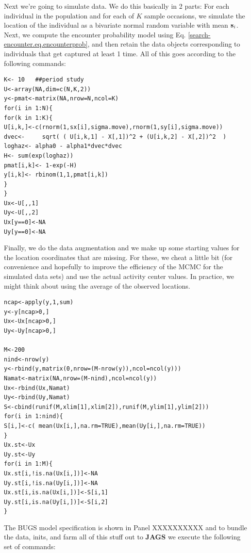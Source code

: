 Next we're going to simulate data. We do this basically in 2 parts:
For each individual in the population and for each of $K$ sample
occasions, we simulate the location of the individual as a bivariate
normal random variable with mean ${\bf s}_i$. Next, we compute the
encounter probability model using
Eq. \ref{search-encounter.eq.encounterprob}, and then retain the
data objects corresponding to individuals that get captured at least 1
time. All of this goes
according to the following commands:
{\small
\begin{verbatim}
K<- 10   ##period study
U<-array(NA,dim=c(N,K,2))
y<-pmat<-matrix(NA,nrow=N,ncol=K)
for(i in 1:N){
for(k in 1:K){
U[i,k,]<-c(rnorm(1,sx[i],sigma.move),rnorm(1,sy[i],sigma.move))
dvec<-     sqrt( ( U[i,k,1] - X[,1])^2 + (U[i,k,2] - X[,2])^2  )
loghaz<- alpha0 - alpha1*dvec*dvec
H<- sum(exp(loghaz))
pmat[i,k]<- 1-exp(-H)
y[i,k]<- rbinom(1,1,pmat[i,k])
}
}
Ux<-U[,,1]
Uy<-U[,,2]
Ux[y==0]<-NA
Uy[y==0]<-NA
\end{verbatim}
}



Finally, we do the data augmentation and we make up some starting
values for the location coordinates that are missing.  For these, we
cheat a little bit (for convenience and hopefully to improve the
efficiency of the MCMC for the simulated data sets) and use the actual
activity center values. In practice, we might think about using the
average of the observed locations.
{\small
\begin{verbatim}
ncap<-apply(y,1,sum)
y<-y[ncap>0,]
Ux<-Ux[ncap>0,]
Uy<-Uy[ncap>0,]

M<-200
nind<-nrow(y)
y<-rbind(y,matrix(0,nrow=(M-nrow(y)),ncol=ncol(y)))
Namat<-matrix(NA,nrow=(M-nind),ncol=ncol(y))
Ux<-rbind(Ux,Namat)
Uy<-rbind(Uy,Namat)
S<-cbind(runif(M,xlim[1],xlim[2]),runif(M,ylim[1],ylim[2]))
for(i in 1:nind){
S[i,]<-c( mean(Ux[i,],na.rm=TRUE),mean(Uy[i,],na.rm=TRUE))
}
Ux.st<-Ux
Uy.st<-Uy
for(i in 1:M){
Ux.st[i,!is.na(Ux[i,])]<-NA
Uy.st[i,!is.na(Uy[i,])]<-NA
Ux.st[i,is.na(Ux[i,])]<-S[i,1]
Uy.st[i,is.na(Uy[i,])]<-S[i,2]
}
\end{verbatim}
}

The BUGS model specification is shown in Panel XXXXXXXXXX and to
bundle the data, inits, and farm
all of this stuff out to {\bf JAGS} we execute the following set of
commands:

